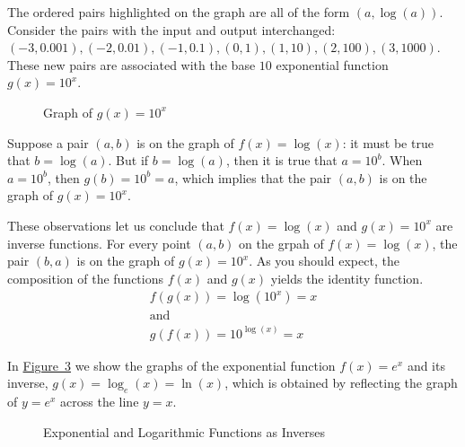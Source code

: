 \documentclass[10pt,]{book}
\theoremstyle{ptxdefinitionnotitle}
\theoremstyle{ptxdefinitiontitle}
\theoremstyle{ptxdefinitionnotitle}
\theoremstyle{ptxdefinitiontitle}
\theoremstyle{ptxdefinitionnotitle}
\theoremstyle{ptxdefinitiontitle}
\numberwithin{equation}{section}
\begin{document}
\hypertarget{p-324}{}%
The ordered pairs highlighted on the graph are all of the form \(\left( a, \log(a) \right)\). Consider the pairs with the input and output interchanged: \((-3,0.001), (-2,0.01), (-1,0.1), (0,1), (1,10), (2,100), (3,1000)\). These new pairs are associated with the base \(10\) exponential function \(g(x) = 10^x\).%
\begin{figure}
\centering
{
}
\caption{Graph of \(g(x) = 10^x\)\label{figure-22}}
\end{figure}
\hypertarget{p-325}{}%
Suppose a pair \(\left(a, b \right)\) is on the graph of \(f(x)=\log \left( x \right)\): it must be true that \(b = \log \left( a \right)\). But if \(b = \log \left( a \right)\), then it is true that \(a = 10^b\). When \(a = 10^b\), then \(g(b) = 10^b = a\), which implies that the pair \(\left(a, b \right)\) is on the graph of \(g(x) = 10^x\).%
\par
\hypertarget{p-326}{}%
These observations let us conclude that \(f(x) = \log \left( x \right)\) and \(g(x) = 10^x\) are inverse functions. For every point \(\left( a, b \right)\) on the grpah of \(f(x) = \log \left( x\right)\), the pair \(\left( b, a \right)\) is on the graph of \(g(x) = 10^x\). As you should expect, the composition of the functions \(f(x)\) and \(g(x)\) yields the identity function.%
\begin{gather*}
f \left( g(x) \right) = \log \left( 10^x \right) = x\\
\text{and}\\
g \left( f(x) \right) = 10^{\log(x)} = x
\end{gather*}
%
\par
\hypertarget{p-327}{}%
In \hyperref[exponential-log-inverses]{Figure~3} we show the graphs of the exponential function \(f(x) = e^x\) and its inverse, \(g(x) = \log_{e} \left( x \right) = \ln \left( x \right)\), which is obtained by reflecting the graph of \(y = e^x\) across the line \(y = x\).%
\begin{figure}
\centering
{
}
\caption{Exponential and Logarithmic Functions as Inverses\label{exponential-log-inverses}}
\end{figure}
\end{document}
